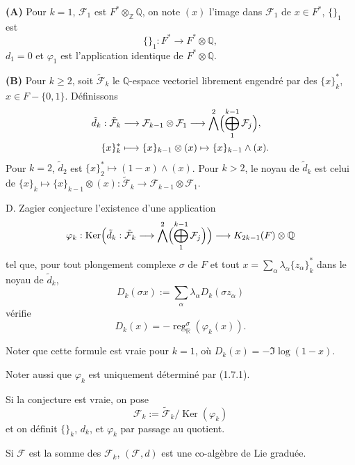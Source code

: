 \documentclass[12pt,a4paper]{article}
\theoremstyle{plain}
\theoremstyle{definition}
\theoremstyle{remark}
\DeclareMathOperator*{\Ker}{Ker}
\DeclareMathOperator{\reg}{reg}
\newcommand{\Q}{\mathbb{Q}}
\newcommand{\R}{\mathbb{R}}
\newcommand{\Z}{\mathbb{Z}}
\newcommand{\F}{\mathcal{F}}
\begin{document}
\textbf{(A)} Pour $k=1$, $\F_1$ est $F^*\otimes_\Z\Q$, on note $(x)$ l'image dans $\F_1$ de $x\in F^*$, $\{\}_1$ est
\begin{equation*}
\{\}_1 : F^* \longrightarrow F^*\otimes\Q,
\end{equation*}
$d_1=0$ et $\varphi_1$ est l'application identique de $F^*\otimes\Q$.

\textbf{(B)} Pour $k\geq 2$, soit $\tilde{\F}_k$ le $\Q$-espace vectoriel librement engendr{\'e} par des $\{x\}_k^*$, $x\in F-\{0,1\}$. D{\'e}finissons
\begin{align*}
\tilde{d}_k : \tilde{\F}_k &\longrightarrow \F_{k-1}\otimes\F_1 \longrightarrow \bigwedge^2\Bigl(\bigoplus_1^{k-1}\F_j\Bigr),\\
\{x\}_k^* &\longmapsto \{x\}_{k-1}\otimes(x) \mapsto \{x\}_{k-1}\wedge(x).
\end{align*}
Pour $k=2$, $\tilde{d}_2$ est $\{x\}_2^*\mapsto(1-x)\wedge(x)$. Pour $k>2$, le noyau de $\tilde{d}_k$ est celui de $\{x\}_k\mapsto\{x\}_{k-1}\otimes(x):\tilde{\F}_k\to\F_{k-1}\otimes\F_1$.

D. Zagier conjecture l'existence d'une application
\begin{equation*}
\varphi_k : \Ker\Bigl(\tilde{d}_k:\tilde{\F}_k\longrightarrow\bigwedge^2\Bigl(\bigoplus_1^{k-1}\F_j\Bigr)\Bigr) \longrightarrow K_{2k-1}(F)\otimes\Q
\end{equation*}
tel que, pour tout plongement complexe $\sigma$ de $F$ et tout $x=\sum_\alpha\lambda_\alpha\{z_\alpha\}_k^*$ dans le noyau de $\tilde{d}_k$,
\begin{equation*}
D_k(\sigma x) := \sum_\alpha\lambda_\alpha D_k(\sigma z_\alpha)
\end{equation*}
v{\'e}rifie
\begin{equation}\label{eq:1.7.1}
D_k(x) = -\reg_\R^\sigma(\varphi_k(x)).
\tag{1.7.1}
\end{equation}

Noter que cette formule est vraie pour $k=1$, o{\`u} $D_k(x)=-\Im\log(1-x)$.

Noter aussi que $\varphi_k$ est uniquement d{\'e}termin{\'e} par (1.7.1).

Si la conjecture est vraie, on pose
\begin{equation*}
\F_k := \tilde{\F}_k/\Ker(\varphi_k)
\end{equation*}
et on d{\'e}finit $\{\}_k$, $d_k$, et $\varphi_k$ par passage au quotient.

Si $\F$ est la somme des $\F_k$, $(\F,d)$ est une co-alg{\`e}bre de Lie gradu{\'e}e.
\end{document}
